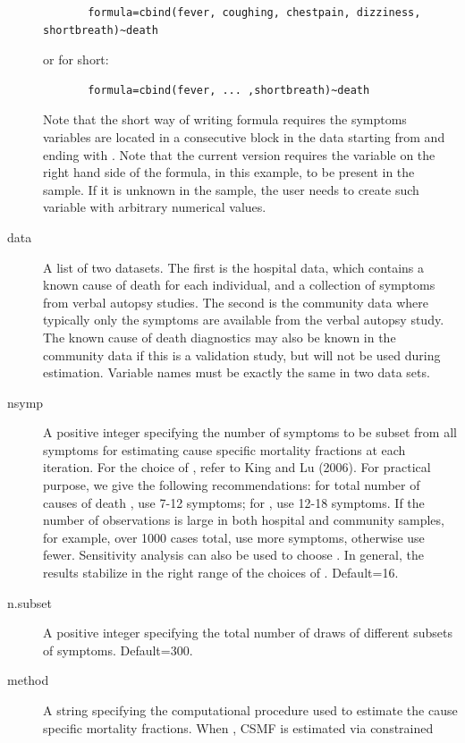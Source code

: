 \documentclass[oneside,letterpaper,titlepage]{article}
\begin{document}
\begin{description}
    \begin{verbatim}
       formula=cbind(fever, coughing, chestpain, dizziness, shortbreath)~death
    \end{verbatim}
  or for short:
    \begin{verbatim}
       formula=cbind(fever, ... ,shortbreath)~death
       \end{verbatim}
  Note that the short way of writing formula requires the symptoms
  variables are located in a consecutive block in the data starting
  from  and ending with .
Note that the current version requires the variable on the right hand
   side of the formula,  in this example, to be present in
   the  sample. If it is unknown in the
    sample, the user needs to create such variable
   with arbitrary numerical values.
\item[data] A list of two datasets. The first is the hospital data,
  which contains a known cause of death for each individual, and a
  collection of symptoms from verbal autopsy studies.  The second is
  the community data where typically only the symptoms are available
  from the verbal autopsy study. The known cause of death diagnostics
  may also be known in the community data if this is a validation
  study, but will not be used during estimation.  Variable names must
  be exactly the same in two data sets.
\item[nsymp] A positive integer specifying the number of symptoms to
  be subset from all symptoms for estimating cause specific mortality
  fractions at each iteration. For the choice of , refer   
  to King and Lu (2006). For practical purpose, we give the following 
  recommendations: for total number of causes of death , 
  use 7-12 symptoms; for , use 12-18 symptoms. If the 
  number of observations is large in both hospital and community samples,
  for example, over 1000 cases total, use more symptoms, 
  otherwise use fewer. Sensitivity analysis can also 
  be used to choose . In general, the results stabilize in 
  the right range of the choices of . Default=16.
\item[n.subset] A positive integer specifying the total number of
  draws of different subsets of symptoms.  Default=300.
\item[method] A string specifying the computational procedure
 used to estimate the cause specific mortality fractions. When 
, CSMF is estimated via constrained 

\end{description}
\end{document}
